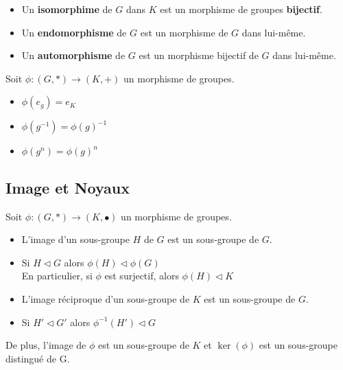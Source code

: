 \begin{definition}
    \begin{itemize}
        \item Un \textbf{isomorphime} de $G$ dans $K$ est un morphisme de groupes \textbf{bijectif}. 
        \item Un \textbf{endomorphisme} de $G$ est un morphisme de $G$ dans lui-même. 
        \item Un \textbf{automorphisme} de $G$ est un morphisme bijectif de $G$ dans lui-même. 
    \end{itemize}
\end{definition}

\begin{prop}[Morphismes]
    Soit $\phi : (G,*) \longrightarrow (K,+)$ un morphisme de groupes. 
    \begin{itemize}
        \item $\phi (e_g) = e_{K} $
        \item $\phi(g^{-1}) = \phi(g)^{-1}$
        \item $\phi(g^n) = \phi(g)^n$
    \end{itemize}
\end{prop}

\subsection{Image et Noyaux}

\begin{lemma}
    Soit $\phi : (G,*) \longrightarrow (K,\bullet)$ un morphisme de groupes. 
    \begin{itemize}
        \item L'image d'un sous-groupe $H$ de $G$ est un sous-groupe de $G$. 
        \item Si $H \vartriangleleft G$ alors $\phi(H) \vartriangleleft \phi(G)$ \\ 
        En particulier, si $\phi$ est surjectif, alors $\phi(H) \vartriangleleft K$ 
        \item L'image réciproque d'un sous-groupe de $K$ est un sous-groupe de $G$.
        \item Si $H' \vartriangleleft G'$ alors $\phi^{-1}(H') \vartriangleleft G$ 
    \end{itemize}
    De plus, l'image de $\phi$ est un sous-groupe de $K$ et $\ker(\phi)$ est un sous-groupe distingué de G.
\end{lemma}

